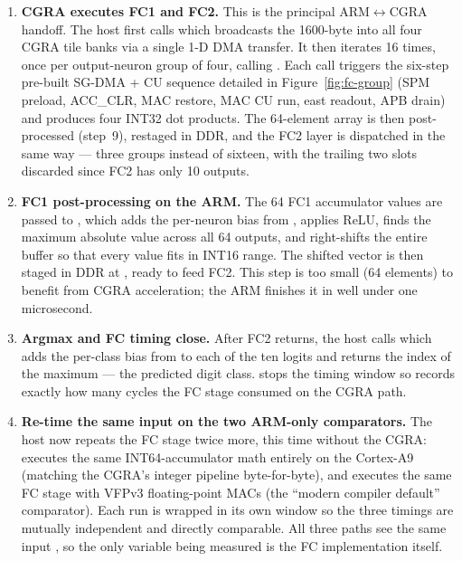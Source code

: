 \begin{enumerate}[leftmargin=2.1em, label=\textbf{Step \arabic*.}, start=6,
                  itemsep=4pt, topsep=2pt]
\item \textbf{CGRA executes FC1 and FC2.} This is the principal
ARM$\leftrightarrow$CGRA handoff. The host first calls
 which broadcasts the
1600-byte  into all four CGRA tile banks via a single
1-D DMA transfer. It then iterates 16 times, once per output-neuron
group of four, calling .
Each call triggers the six-step pre-built SG-DMA + CU sequence
detailed in Figure~\ref{fig:fc-group} (SPM preload, ACC\_CLR, MAC
restore, MAC CU run, east readout, APB drain) and produces four
INT32 dot products. The 64-element  array is then
post-processed (step~9), restaged in DDR, and the FC2 layer is
dispatched in the same way --- three groups instead of sixteen,
with the trailing two slots discarded since FC2 has only 10 outputs.

\item \textbf{FC1 post-processing on the ARM.} The 64 FC1 accumulator
values are passed to , which adds the
per-neuron bias from , applies ReLU,
finds the maximum absolute value across all 64 outputs, and right-shifts
the entire buffer so that every value fits in INT16 range. The
shifted vector  is then staged in DDR at
, ready to feed FC2. This step
is too small (64 elements) to benefit from CGRA acceleration; the ARM
finishes it in well under one microsecond.

\item \textbf{Argmax and FC timing close.} After FC2 returns, the
host calls  which adds the
per-class bias from  to each of the ten
logits and returns the index of the maximum --- the predicted digit
class.  stops the timing window so
 records exactly how many cycles the
FC stage consumed on the CGRA path.

\item \textbf{Re-time the same input on the two ARM-only comparators.}
The host now repeats the FC stage twice more, this time without the
CGRA:  executes the
same INT64-accumulator math entirely on the Cortex-A9 (matching the
CGRA's integer pipeline byte-for-byte), and
 executes the same
FC stage with VFPv3 floating-point MACs (the ``modern compiler
default'' comparator). Each run is wrapped in its own
 window so the three timings are mutually
independent and directly comparable. All three paths see the same
input , so the only variable being measured is the FC
implementation itself.


\end{enumerate}
